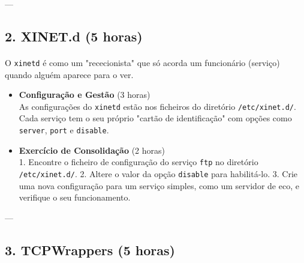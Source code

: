 \documentclass[10pt,a4paper]{article}
\begin{document}
	---
	
	\subsection*{2. XINET.d (5 horas)}
	\vspace{-1.2em}
	\paragraph{}
	O \texttt{xinetd} é como um "rececionista" que só acorda um funcionário (serviço) quando alguém aparece para o ver.
	
	\begin{itemize}
		\item \textbf{Configuração e Gestão} (3 horas) \\
		As configurações do \texttt{xinetd} estão nos ficheiros do diretório \texttt{/etc/xinet.d/}. Cada serviço tem o seu próprio "cartão de identificação" com opções como \texttt{server}, \texttt{port} e \texttt{disable}.
		
		\item \textbf{Exercício de Consolidação} (2 horas) \\
		1. Encontre o ficheiro de configuração do serviço \texttt{ftp} no diretório \texttt{/etc/xinet.d/}.
		2. Altere o valor da opção \texttt{disable} para habilitá-lo.
		3. Crie uma nova configuração para um serviço simples, como um servidor de eco, e verifique o seu funcionamento.
	\end{itemize}
	
	---
	
	\subsection*{3. TCPWrappers (5 horas)}
	\vspace{-1.2em}
\end{document}
